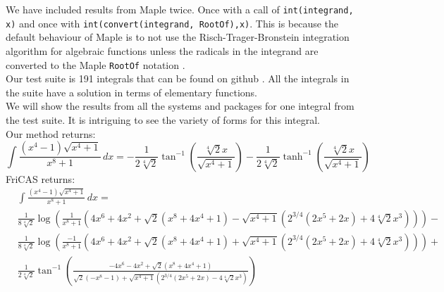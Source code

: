 \documentclass[12pt]{article}
\numberwithin{equation}{section}
\theoremstyle{definition}
\begin{document}
We have included results from Maple twice. Once with a call of \texttt{int(integrand, x)} 
and once with \texttt{int(convert(integrand, RootOf),x)}. This is because the default 
behaviour of Maple is to not use the Risch-Trager-Bronstein integration 
algorithm for algebraic functions unless the radicals in the integrand are converted 
to the Maple \texttt{RootOf} notation \cite[pp. 16--23]{rybowicz1992}.\\

Our test suite is 191 integrals that can be found on github \cite{test_suite_github}. 
All the integrals in the suite have a solution in terms of elementary functions. \\

We will show the results from all the systems and packages for one integral from the test 
suite. It is intriguing to see the variety of forms for this integral. \\

\noindent Our method returns:
\small
\begin{equation*}
\int \frac{\left(x^4-1\right) \sqrt{x^4+1}}{x^8+1} \, dx= 
-\frac{1}{2 \sqrt[4]{2}}\tan ^{-1}\left(\frac{\sqrt[4]{2} x}{\sqrt{x^4+1}}\right) - 
\frac{1}{2 \sqrt[4]{2}}\tanh^{-1}\left(\frac{\sqrt[4]{2} x}{\sqrt{x^4+1}}\right)
\end{equation*}
\normalsize
FriCAS returns:
\small
\begin{align*}
& \int \frac{\left(x^4-1\right) \sqrt{x^4+1}}{x^8+1} \, dx = \\
& \frac{1}{8 \sqrt[4]{2}}\log\left(\frac{1}{x^8+1}\left(4 x^6+4 x^2+\sqrt{2} \left(x^8+4x^4+1\right)
-\sqrt{x^4+1} \left(2^{3/4} \left(2 x^5+2 x\right)+4 \sqrt[4]{2} x^3\right)\right)\right) - \\
&\frac{1}{8 \sqrt[4]{2}}\log \left(\frac{-1}{x^8+1}\left(4x^6+4 x^2+\sqrt{2} \left(x^8+4 x^4+1\right)+
\sqrt{x^4+1} \left(2^{3/4} \left(2 x^5+2 x\right)+4 \sqrt[4]{2} x^3\right)\right)\right) + \\
& \frac{1}{2\sqrt[4]{2}}\tan ^{-1}\left(\frac{-4 x^6-4 x^2+\sqrt{2} \left(x^8+4 x^4+1\right)}{\sqrt{2} \left(-x^8-1\right)+\sqrt{x^4+1} \left(2^{3/4} \left(2x^5+2 x\right)-4 \sqrt[4]{2} x^3\right)}\right)
\end{align*}
\normalsize
\end{document}
